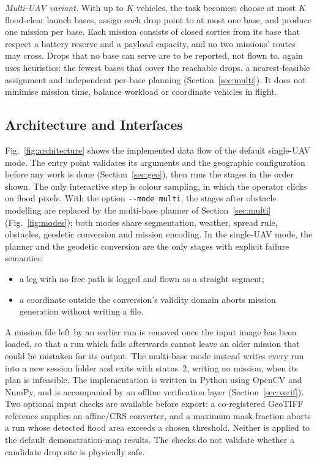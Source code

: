 \emph{Multi-UAV variant.} With up to $K$ vehicles, the task becomes: choose at most $K$ flood-clear launch bases, assign each drop point to at most one base, and produce one mission per base. Each mission consists of closed sorties from its base that respect a battery reserve and a payload capacity, and no two missions' routes may cross. Drops that no base can serve are to be reported, not flown to. \adapt{} again uses heuristics: the fewest bases that cover the reachable drops, a nearest-feasible assignment and independent per-base planning (Section~\ref{sec:multi}). It does not minimise mission time, balance workload or coordinate vehicles in flight.



\subsection{Architecture and Interfaces}
Fig.~\ref{fig:architecture} shows the implemented data flow of the default single-UAV mode. The entry point validates its arguments and the geographic configuration before any work is done (Section~\ref{sec:geo}), then runs the stages in the order shown. The only interactive step is colour sampling, in which the operator clicks on flood pixels. With the option \texttt{-{}-mode multi}, the stages after obstacle modelling are replaced by the multi-base planner of Section~\ref{sec:multi} (Fig.~\ref{fig:modes}); both modes share segmentation, weather, spread rule, obstacles, geodetic conversion and mission encoding. In the single-UAV mode, the planner and the geodetic conversion are the only stages with explicit failure semantics:
\begin{itemize}
\item a leg with no free path is logged and flown as a straight segment;
\item a coordinate outside the conversion's validity domain aborts mission generation without writing a file.
\end{itemize}
A mission file left by an earlier run is removed once the input image has been loaded, so that a run which fails afterwards cannot leave an older mission that could be mistaken for its output. The multi-base mode instead writes every run into a new session folder and exits with status~2, writing no mission, when its plan is infeasible. The implementation is written in Python using OpenCV \cite{bradski2000opencv} and NumPy, and is accompanied by an offline verification layer (Section~\ref{sec:verif}).
Two optional input checks are available before export: a co-registered GeoTIFF reference supplies an affine/CRS converter, and a maximum mask fraction aborts a run whose detected flood area exceeds a chosen threshold. Neither is applied to the default demonstration-map results. The checks do not validate whether a candidate drop site is physically safe.
